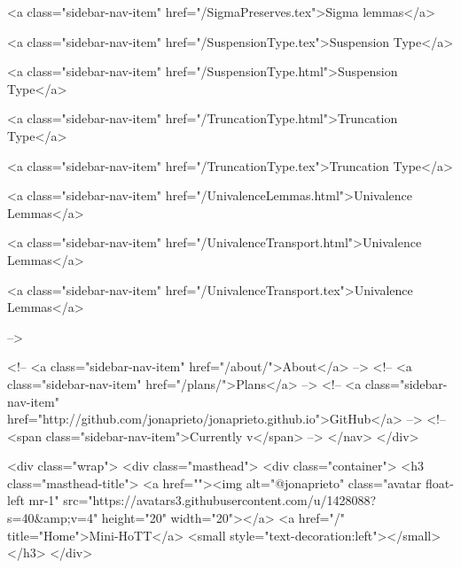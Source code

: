       
    
      
        
          <a class="sidebar-nav-item" href="/SigmaPreserves.tex">Sigma lemmas</a>
        
      
    
      
        
          <a class="sidebar-nav-item" href="/SuspensionType.tex">Suspension Type</a>
        
      
    
      
        
          <a class="sidebar-nav-item" href="/SuspensionType.html">Suspension Type</a>
        
      
    
      
        
          <a class="sidebar-nav-item" href="/TruncationType.html">Truncation Type</a>
        
      
    
      
        
          <a class="sidebar-nav-item" href="/TruncationType.tex">Truncation Type</a>
        
      
    
      
        
          <a class="sidebar-nav-item" href="/UnivalenceLemmas.html">Univalence Lemmas</a>
        
      
    
      
        
          <a class="sidebar-nav-item" href="/UnivalenceTransport.html">Univalence Lemmas</a>
        
      
    
      
        
          <a class="sidebar-nav-item" href="/UnivalenceTransport.tex">Univalence Lemmas</a>
        
      
     -->

    <!-- <a class="sidebar-nav-item" href="/about/">About</a> -->
    <!-- <a class="sidebar-nav-item" href="/plans/">Plans</a> -->
    <!-- <a class="sidebar-nav-item" href="http://github.com/jonaprieto/jonaprieto.github.io">GitHub</a> -->
    <!-- <span class="sidebar-nav-item">Currently v</span> -->
  </nav>
</div>

    <div class="wrap">
      <div class="masthead">
        <div class="container">
          <h3 class="masthead-title">
            <a href=""><img alt="@jonaprieto" class="avatar float-left mr-1" src="https://avatars3.githubusercontent.com/u/1428088?s=40&amp;v=4" height="20" width="20"></a>
            <a href="/" title="Home">Mini-HoTT</a>
            <small style="text-decoration:left"></small>
          </h3>
        </div>
      
